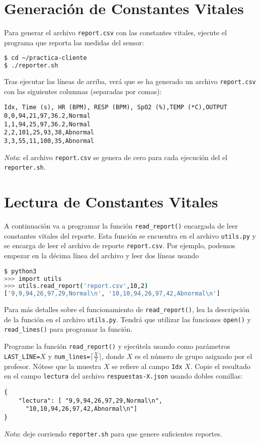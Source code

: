 \documentclass{upmassignment}
\begin{document}
\section*{Generación de Constantes Vitales}
\noindent Para generar el archivo
\texttt{report.csv} con las constantes
vitales, ejecute el programa
que reporta las medidas del sensor:
\begin{lstlisting}[language=bash]
$ cd ~/practica-cliente
$ ./reporter.sh
\end{lstlisting}
Tras ejecutar las líneas de arriba,
verá que se ha generado un archivo
\texttt{report.csv} con las siguientes
columnas (separadas por comas):
\begin{lstlisting}
Idx, Time (s), HR (BPM), RESP (BPM), SpO2 (%),TEMP (*C),OUTPUT
0,0,94,21,97,36.2,Normal
1,1,94,25,97,36.2,Normal
2,2,101,25,93,38,Abnormal
3,3,55,11,100,35,Abnormal
\end{lstlisting}
\emph{Nota}:
el archivo \texttt{report.csv} se genera
de cero para cada ejecución del
el \texttt{reporter.sh}. 


\section*{Lectura de Constantes Vitales}
\noindent 
A continuación va a programar la
función \texttt{read\_report()} encargada
de leer constantes vitales del reporte.
Esta función se encuentra en el archivo
\texttt{utils.py} y se encarga
de leer el archivo de reporte
\texttt{report.csv}. Por ejemplo,
podemos empezar en la décima línea
del archivo y leer dos líneas usando
\begin{lstlisting}[language=bash]
$ python3
>>> import utils
>>> utils.read_report('report.csv',10,2)
['9,9,94,26,97,29,Normal\n', '10,10,94,26,97,42,Abnormal\n']
\end{lstlisting}

Para más detalles sobre el funcionamiento
de \texttt{read\_report()}, lea
la descripción de la función en el
archivo \texttt{utils.py}.
Tendrá que utilizar las funciones
\texttt{open()} y \texttt{read\_lines()}
para programar la función.


\begin{problemlist}
    \pbitem Programe la función
    \texttt{read\_report()} y
    ejecútela usando como parámetros
    \texttt{LAST\_LINE=$X$}
    y
    \texttt{num\_lines=$\lceil \tfrac{X}{2} \rceil$},
    donde $X$ es el número de grupo
    asignado por el profesor.
        Nótese que la muestra $X$
        se refiere al campo \texttt{Idx}
        $X$.
    Copie el resultado en el
    campo \texttt{lectura} del
    archivo
    \texttt{respuestas-X.json}
    usando dobles comillas:
\begin{lstlisting}
{
    "lectura": [ "9,9,94,26,97,29,Normal\n",
      "10,10,94,26,97,42,Abnormal\n"]
}
\end{lstlisting}
\end{problemlist}
\emph{Nota}: deje corriendo
\texttt{reporter.sh} para que genere
suficientes reportes.
\end{document}
